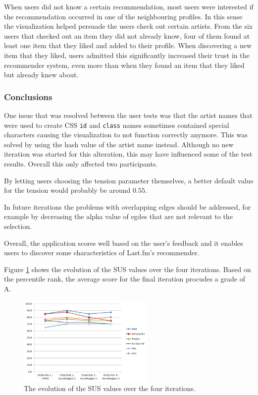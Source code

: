 When users did not know a certain recommendation, most users were interested if the recommendation occurred in one of the neighbouring profiles. In this sense the visualization helped persuade the users check out certain artists. From the six users that checked out an item they did not already know, four of them found at least one item that they liked and added to their profile. When discovering a new item that they liked, users admitted this significantly increased their trust in the recommender system, even more than when they found an item that they liked but already knew about.



\subsubsection{Conclusions}\label{chapter:prototype:section:soundsuggest3:conclusion}

One issue that was resolved between the user tests was that the artist names that were used to create CSS \texttt{id} and \texttt{class} names sometimes contained special characters causing the visualization to not function correctly anymore. This was solved by using the hash value of the artist name instead. Although no new iteration was started for this alteration, this may have influenced some of the test results. Overall this only affected two participants.

By letting users choosing the tension parameter themselves, a better default value for the tension would probably be around $0.55$.

In future iterations the problems with overlapping edges should be addressed, for example by decreasing the alpha value of egdes that are not relevant to the selection.


Overall, the application scores well based on the user's feedback and it enables users to discover some characteristics of Last.fm's recommender.

Figure \ref{figure:iterations_sus_scores} shows the evolution of the SUS values over the four iterations. Based on the percentile rank, the average score for the final iteration procudes a grade of A.

\begin{figure}%
	\begin{center}
		\includegraphics[width=250px]{img/iterations_sus_scores}%
	\end{center}
	\caption{The evolution of the SUS values over the four iterations.}%
	\label{figure:iterations_sus_scores}%
\end{figure}

